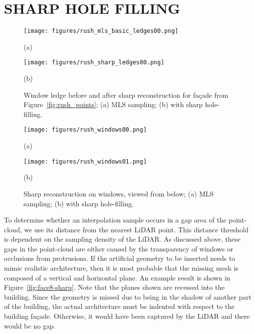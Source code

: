 \documentclass{article}
\begin{document}
\section{SHARP HOLE FILLING}
\label{sec:holes}

\begin{figure}[t]

\begin{minipage}[b]{1\linewidth}
  \centering
  \centerline{\texttt{[image: figures/rush\_mls\_basic\_ledges00.png]}}
  \centerline{(a)}\medskip
\end{minipage}
\begin{minipage}[b]{1\linewidth}
  \centering
  \centerline{\texttt{[image: figures/rush\_sharp\_ledges00.png]}}
  \centerline{(b)}\medskip
\end{minipage}
%
\caption{Window ledge before and after sharp reconstruction for fa\c{c}ade from Figure~\ref{fig:rush_points}; (a) MLS sampling; (b) with sharp hole-filling. }
\label{fig:rush-sharp}
%
\end{figure}

\begin{figure}[t]

\begin{minipage}[b]{1\linewidth}
  \centering
  \centerline{\texttt{[image: figures/rush\_windows00.png]}}
  \centerline{(a)}\medskip
\end{minipage}
\begin{minipage}[b]{1\linewidth}
  \centering
  \centerline{\texttt{[image: figures/rush\_windows01.png]}}
  \centerline{(b)}\medskip
\end{minipage}
%
\caption{Sharp reconstruction on windows, viewed from below; (a) MLS sampling; (b) with sharp hole-filling. }
\label{fig:rush-windows}
%
\end{figure}

To determine whether an interpolation sample occurs in a gap area of the point-cloud, we use its distance from the nearest LiDAR point.  This distance threshold is dependent on the sampling density of the LiDAR.  As discussed above, these gaps in the point-cloud are either caused by the transparency of windows or occlusions from protrusions.  If the artificial geometry to be inserted needs to mimic realistic architecture, then it is most probable that the missing mesh is composed of a vertical and horizontal plane.  An example result is shown in Figure~\ref{fig:face8-sharp}.  Note that the planes shown are recessed into the building.  Since the geometry is missed due to being in the shadow of another part of the building, the actual architecture must be indented with respect to the building fa\c{c}ade.  Otherwise, it would have been captured by the LiDAR and there would be no gap.
\end{document}
